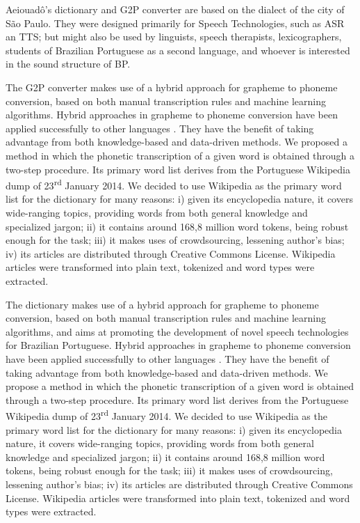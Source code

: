 Aeiouad\^o's dictionary and G2P converter are based on the dialect of the city of S\~ao Paulo. They were designed primarily for Speech Technologies, such as \ac{ASR} an \ac{TTS}; but might also be used by linguists, speech therapists, lexicographers, students of Brazilian Portuguese as a second language, and whoever is interested in the sound structure of \ac{BP}.

The G2P converter makes use of a hybrid approach for grapheme to phoneme conversion, based on both manual transcription rules and machine learning algorithms. Hybrid approaches in grapheme to phoneme conversion have been applied successfully to other languages \cite{Damper1998, Polyakova2006, Teixeira2006, Veiga2013}. They have the benefit of taking advantage from both knowledge-based and data-driven methods. We proposed a method in which the phonetic transcription of a given word is obtained through a two-step procedure. Its primary word list derives from the Portuguese Wikipedia dump of 23\textsuperscript{rd} January 2014. We decided to use Wikipedia as the primary word list for the dictionary for many reasons: i) given its encyclopedia nature, it covers wide-ranging topics, providing words from both general knowledge and specialized jargon; ii) it contains around 168,8 million word tokens, being robust enough for the task; iii) it makes uses of crowdsourcing, lessening author's bias; iv) its articles are distributed through Creative Commons License. Wikipedia articles were transformed into plain text, tokenized and word types were extracted.

The dictionary makes use of a hybrid approach for grapheme to phoneme conversion, based on both manual transcription rules and machine learning algorithms, and aims at promoting the development of novel speech technologies for Brazilian Portuguese. Hybrid approaches in grapheme to phoneme conversion have been applied successfully to other languages \cite{Damper1998}\cite{Polyakova2006}\cite{Teixeira2006}\cite{Veiga2013}. They have the benefit of taking advantage from both knowledge-based and data-driven methods. We propose a method in which the phonetic transcription of a given word is obtained through a two-step procedure. Its primary word list derives from the Portuguese Wikipedia dump of 23\textsuperscript{rd} January 2014. We decided to use Wikipedia as the primary word list for the dictionary for many reasons: i) given its encyclopedia nature, it covers wide-ranging topics, providing words from both general knowledge and specialized jargon; ii) it contains around 168,8 million word tokens, being robust enough for the task; iii) it makes uses of crowdsourcing, lessening author's bias; iv) its articles are distributed through Creative Commons License. Wikipedia articles were transformed into plain text, tokenized and word types were extracted.

